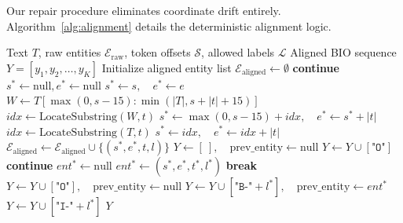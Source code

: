 Our repair procedure eliminates coordinate drift entirely. Algorithm~\ref{alg:alignment} details the deterministic alignment logic.

\begin{algorithm}[htb]
\caption{Deterministic Subword Alignment Repair}
\label{alg:alignment}
\footnotesize
\begin{algorithmic}[1]
\REQUIRE Text $T$, raw entities $\mathcal{E}_{\text{raw}}$, token offsets $\mathcal{S}$, allowed labels $\mathcal{L}$
\ENSURE Aligned BIO sequence $Y = [y_1, y_2, \dots, y_K]$
\STATE Initialize aligned entity list $\mathcal{E}_{\text{aligned}} \leftarrow \emptyset$
        \STATE \textbf{continue}
    \ENDIF
    \STATE $s^* \leftarrow \text{null}, e^* \leftarrow \text{null}$
        \STATE $s^* \leftarrow s, \quad e^* \leftarrow e$ 
        \STATE $W \leftarrow T[\max(0, s-15) : \min(|T|, s+|t|+15)]$
        \STATE $idx \leftarrow \text{LocateSubstring}(W, t)$
            \STATE $s^* \leftarrow \max(0, s-15) + idx, \quad e^* \leftarrow s^* + |t|$
        \ENDIF
    \ENDIF
        \STATE $idx \leftarrow \text{LocateSubstring}(T, t)$ 
            \STATE $s^* \leftarrow idx, \quad e^* \leftarrow idx + |t|$
        \ENDIF
    \ENDIF
        \STATE $\mathcal{E}_{\text{aligned}} \leftarrow \mathcal{E}_{\text{aligned}} \cup \{(s^*, e^*, t, l)\}$
    \ENDIF
\ENDFOR
\STATE $Y \leftarrow [~], \quad \text{prev\_entity} \leftarrow \text{null}$
    \IF{$\sigma = \tau$}
        \STATE $Y \leftarrow Y \cup [\texttt{"O"}]$ 
        \STATE \textbf{continue}
    \ENDIF
    \STATE $ent^* \leftarrow \text{null}$
            \STATE $ent^* \leftarrow (s^*, e^*, t^*, l^*)$
            \STATE \textbf{break}
        \ENDIF
    \ENDFOR
        \STATE $Y \leftarrow Y \cup [\texttt{"O"}], \quad \text{prev\_entity} \leftarrow \text{null}$
        \STATE $Y \leftarrow Y \cup [\texttt{"B-"}+l^*], \quad \text{prev\_entity} \leftarrow ent^*$
    \ELSE
        \STATE $Y \leftarrow Y \cup [\texttt{"I-"}+l^*]$
    \ENDIF
\ENDFOR
\RETURN $Y$
\end{algorithmic}
\end{algorithm}

